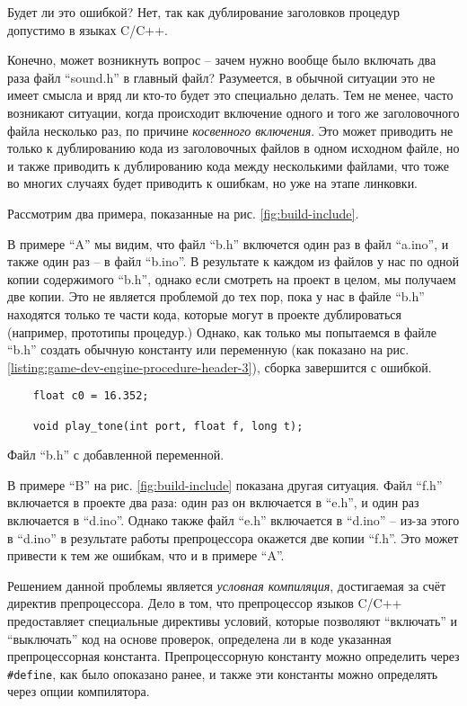 \documentclass[../sparc.tex]{subfiles}
\begin{document}
Будет ли это ошибкой?  Нет, так как дублирование заголовков процедур допустимо в
языках C/C++.

Конечно, может возникнуть вопрос -- зачем нужно вообще было включать два раза
файл ``sound.h'' в главный файл?  Разумеется, в обычной ситуации это не имеет
смысла и вряд ли кто-то будет это специально делать.  Тем не менее, часто
возникают ситуации, когда происходит включение одного и того же заголовочного
файла несколько раз, по причине \emph{косвенного включения}.  Это может
приводить не только к дублированию кода из заголовочных файлов в одном исходном
файле, но и также приводить к дублированию кода между несколькими файлами, что
тоже во многих случаях будет приводить к ошибкам, но уже на этапе линковки.

Рассмотрим два примера, показанные на рис. \ref{fig:build-include}.


В примере ``A'' мы видим, что файл ``b.h'' включется один раз в файл ``a.ino'',
и также один раз -- в файл ``b.ino''.  В результате к каждом из файлов у нас по
одной копии содержимого ``b.h'', однако если смотреть на проект в целом, мы
получаем две копии.  Это не является проблемой до тех пор, пока у нас в файле
``b.h'' находятся только те части кода, которые могут в проекте дублироваться
(например, прототипы процедур.)  Однако, как только мы попытаемся в файле
``b.h'' создать обычную константу или переменную (как показано на
рис. \ref{listing:game-dev-engine-procedure-header-3}), сборка завершится с
ошибкой.

\begin{listing}[H]
  \begin{verbatim}
    float c0 = 16.352;

    void play_tone(int port, float f, long t);
  \end{verbatim}
  \label{listing:game-dev-engine-procedure-header-3}
  \caption{Файл ``b.h'' с добавленной переменной.}
\end{listing}

В примере ``B'' на рис. \ref{fig:build-include} показана другая ситуация.  Файл
``f.h'' включается в проекте два раза: один раз он включается в ``e.h'', и один
раз включается в ``d.ino''.  Однако также файл ``e.h'' включается в ``d.ino'' --
из-за этого в ``d.ino'' в результате работы препроцессора окажется две копии
``f.h''.  Это может привести к тем же ошибкам, что и в примере ``A''.

Решением данной проблемы является \emph{условная компиляция}, достигаемая за
счёт директив препроцессора.  Дело в том, что препроцессор языков C/C++
предоставляет специальные директивы условий, которые позволяют ``включать'' и
``выключать'' код на основе проверок, определена ли в коде указанная
препроцессорная константа.  Препроцессорную константу можно определить через
\texttt{#define}, как было опоказано ранее, и также эти константы можно
определять через опции компилятора.
\end{document}
